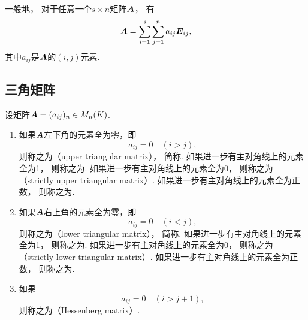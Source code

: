 一般地，
对于任意一个\(s \times n\)矩阵\(\boldsymbol{A}\)，
有\begin{equation*}
	\boldsymbol{A} = \sum_{i=1}^s \sum_{j=1}^n a_{ij} \boldsymbol{E}_{ij},
\end{equation*}
其中\(a_{ij}\)是\(\boldsymbol{A}\)的\((i,j)\)元素.

\subsection{三角矩阵}
\begin{definition}
设矩阵\(\boldsymbol{A}=(a_{ij})_n \in M_n(K)\).
\begin{enumerate}
	\item 如果\(\boldsymbol{A}\)左下角的元素全为零，即\begin{equation*}
		a_{ij} = 0
		\quad(i>j),
	\end{equation*}
	则称之为（upper triangular matrix），
	简称.
	如果进一步有主对角线上的元素全为1，
	则称之为.
	如果进一步有主对角线上的元素全为0，
	则称之为（strictly upper triangular matrix）.
	如果进一步有主对角线上的元素全为正数，
	则称之为.

	\item 如果\(\boldsymbol{A}\)右上角的元素全为零，即\begin{equation*}
		a_{ij} = 0
		\quad(i<j),
	\end{equation*}
	则称之为（lower triangular matrix），
	简称.
	如果进一步有主对角线上的元素全为1，
	则称之为.
	如果进一步有主对角线上的元素全为0，
	则称之为（strictly lower triangular matrix）.
	如果进一步有主对角线上的元素全为正数，
	则称之为.

	\item 如果\begin{equation*}
		a_{ij} = 0
		\quad(i>j+1),
	\end{equation*}
	则称之为（Hessenberg matrix）.
\end{enumerate}
\end{definition}

